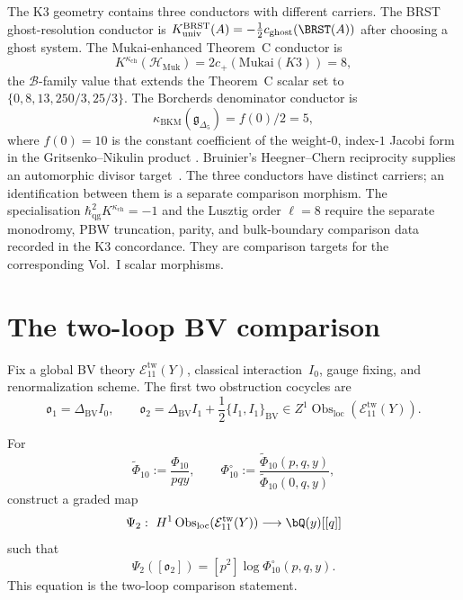 \begin{remark}
\label{rem:bvbrst-koszul-conductor}
The K3 geometry contains three conductors with different carriers. The
BRST ghost-resolution conductor is
$K_{\mathrm{univ}}^{\mathrm{BRST}}(A)
=-\tfrac12c_{\mathrm{ghost}}(\BRST(A))$ after choosing a ghost system.
The Mukai-enhanced Theorem~C conductor is
\[
 K^{\kappa_{\mathrm{ch}}}(\mathcal{H}_{\mathrm{Muk}})
 =2c_+(\mathrm{Mukai}(K3))=8,
\]
the $\mathcal B$-family value that extends the Theorem~C scalar set to
$\{0,8,13,250/3,25/3\}$. The Borcherds denominator conductor is
\[
 \kappa_{\mathrm{BKM}}(\mathfrak g_{\Delta_5})=f(0)/2=5,
\]
where $f(0)=10$ is the constant coefficient of the weight-$0$,
index-$1$ Jacobi form in the Gritsenko--Nikulin product
\cite{GN96Igusa}. Bruinier's Heegner--Chern reciprocity supplies an
automorphic divisor target~\cite[Proposition 5.1]{Bruinier2002}.
The three conductors have distinct carriers; an identification between
them is a separate comparison morphism. The
specialisation $\hbar_{\mathrm{qg}}^2K^{\kappa_{\mathrm{ch}}}=-1$ and
the Lusztig order $\ell=8$ require the separate monodromy, PBW
truncation, parity, and bulk-boundary comparison data recorded in the
K3 concordance. They are comparison targets for the corresponding
Vol.~I scalar morphisms.
\end{remark}

\section{The two-loop BV comparison}
\label{sec:bvbrst-supplement-ii}

Fix a global BV theory $\mathcal E_{11}^{\mathrm{tw}}(Y)$, classical
interaction~$I_0$, gauge fixing, and renormalization scheme.  The first
two obstruction cocycles are
\[
 \mathfrak o_1=\Delta_{\mathrm{BV}}I_0,\qquad
 \mathfrak o_2=\Delta_{\mathrm{BV}}I_1
 +\frac12\{I_1,I_1\}_{\mathrm{BV}}
 \in Z^1\operatorname{Obs}_{\mathrm{loc}}
        (\mathcal E_{11}^{\mathrm{tw}}(Y)).
\]

\begin{conjecture}
\label{prop:bvbrst-2loop-obstruction}
For
\[
 \widetilde\Phi_{10}:=\frac{\Phi_{10}}{pqy},\qquad
 \Phi_{10}^{\circ}:=
 \frac{\widetilde\Phi_{10}(p,q,y)}
      {\widetilde\Phi_{10}(0,q,y)},
\]
construct a graded map
\[
 \Psi_2:\ H^1\operatorname{Obs}_{\mathrm{loc}}
        (\mathcal E_{11}^{\mathrm{tw}}(Y))
 \longrightarrow\bQ(y)[[q]]
\]
such that
\[
 \Psi_2([\mathfrak o_2])
 =[p^2]\log\Phi_{10}^{\circ}(p,q,y).
\]
This equation is the two-loop comparison statement.
\end{conjecture}

